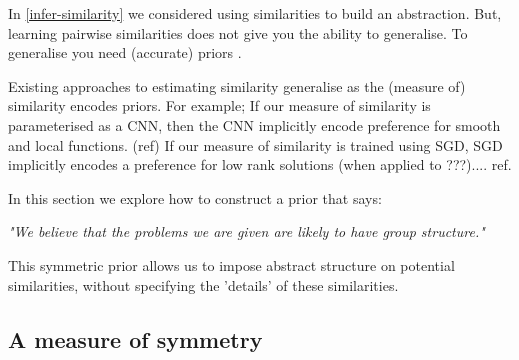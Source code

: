 
In \ref{infer-similarity} we considered using similarities
to build an abstraction. But, learning pairwise similarities does not give
you the ability to generalise. To generalise you need (accurate) priors \cite{Wolpert1996}.

Existing approaches to estimating similarity generalise as the (measure of) similarity encodes priors.
For example;
If our measure of similarity is parameterised as a CNN, then the CNN implicitly encode preference for smooth and local functions. (ref)
If our measure of similarity is trained using SGD, SGD implicitly encodes a preference for low rank solutions (when applied to ???).... ref.

In this section we explore how to construct a prior that says:

\begin{displayquote}
	\textsl{"We believe that the problems we are given are likely to have group structure."}
\end{displayquote}

This symmetric prior allows us to impose abstract structure on potential similarities, without specifying
the 'details' of these similarities.

%
%
%


\subsection{A measure of symmetry}

